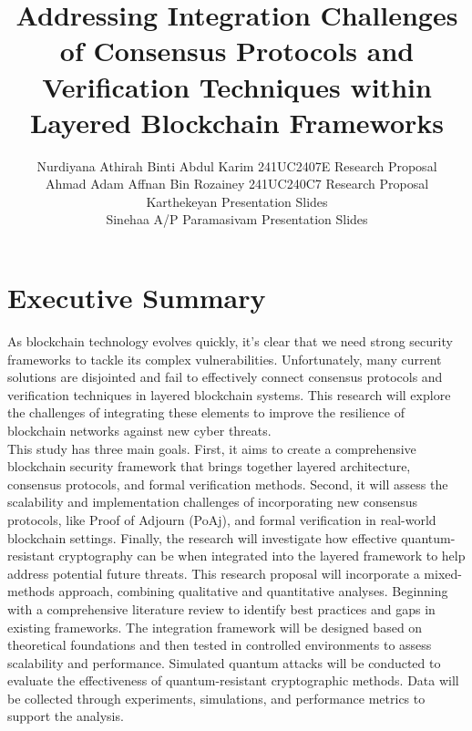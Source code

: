 \documentclass[a4paper, 12pt]{article}
\author{
Nurdiyana Athirah Binti Abdul Karim \quad 241UC2407E \quad Research Proposal \\
Ahmad Adam Affnan Bin Rozainey \quad 241UC240C7 \quad Research Proposal\\
Karthekeyan \quad 1211108235 \quad Presentation Slides\\
Sinehaa A/P Paramasivam \quad 1211103116 \quad Presentation Slides\\
}
\title{ Addressing Integration Challenges of Consensus Protocols and Verification Techniques within Layered Blockchain Frameworks  }
\begin{document}
\maketitle

\section*{Executive Summary}
As blockchain technology evolves quickly, it's clear that we need strong security frameworks to tackle its complex vulnerabilities. Unfortunately, many current solutions are disjointed and fail to effectively connect consensus protocols and verification techniques in layered blockchain systems. This research will explore the challenges of integrating these elements to improve the resilience of blockchain networks against new cyber threats.\\

This study has three main goals. First, it aims to create a comprehensive blockchain security framework that brings together layered architecture, consensus protocols, and formal verification methods. Second, it will assess the scalability and implementation challenges of incorporating new consensus protocols, like Proof of Adjourn (PoAj), \cite{sayeed} and formal verification in real-world blockchain settings. Finally, the research will investigate how effective quantum-resistant cryptography can be when integrated into the layered framework to help address potential future threats.
This research proposal will incorporate a mixed-methods approach, combining qualitative and quantitative analyses. Beginning with a comprehensive literature review to identify best practices and gaps in existing frameworks. The integration framework will be designed based on theoretical foundations and then tested in controlled environments to assess scalability and performance. Simulated quantum attacks will be conducted to evaluate the effectiveness of quantum-resistant cryptographic methods. Data will be collected through experiments, simulations, and performance metrics to support the analysis.\\
\end{document}
